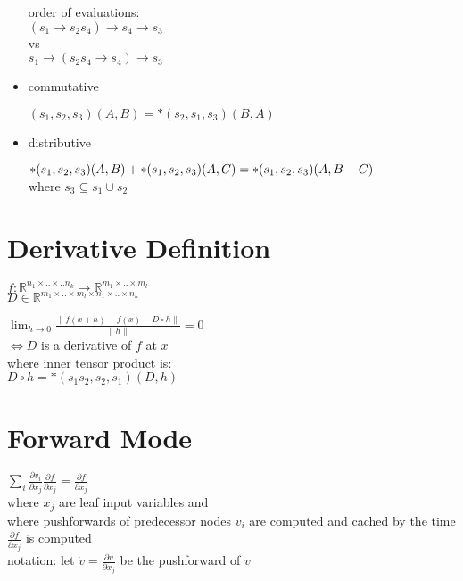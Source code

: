 \documentclass[8pt]{extarticle}
\newcommand{\R}{\mathbb{R}}
\begin{document}
\begin{multicols*}{2}
\begin{itemize}
    order of evaluations:\\
    $(s_1 \rightarrow s_2 s_4) \rightarrow s_4 \rightarrow s_3$\\
    vs\\
    $s_1 \rightarrow (s_2 s_4 \rightarrow s_4) \rightarrow s_3$
     
    \item commutative

      $(s_1,s_2,s_3)(A,B) = *(s_2,s_1,s_3)(B,A)$
    
    \item distributive

      $*(s_1,s_2,s_3)(A,B) + *(s_1,s_2,s_3)(A,C)\\= *(s_1,s_2,s_3)(A, B+C)$\\
      where $s_3 \subseteq s_1 \cup s_2$

  \end{itemize}

  \section{Derivative Definition}

  $f: \R^{n_1 \times .. \times .. n_k} \rightarrow \R^{m_1 \times .. \times m_l}$\\
  $D \in \R^{m_1 \times .. \times m_l \times n_1 \times .. \times n_k}$

  $\lim_{h \rightarrow 0} \frac{\| f(x+h) - f(x) - D \circ h\|}{\| h \|} = 0$\\
  $\iff D$ is a derivative of $f$ at $x$\\
  
  where inner tensor product is: \\
  $D \circ h = *(s_1 s_2, s_2, s_1)(D,h)$

  \vfill\null
  \columnbreak
    
  \section{Forward Mode}
  $\sum_{i} \frac{ \partial v_i}{\partial x_j} \frac{\partial f}{\partial x_j} = \frac{\partial f}{\partial x_j}$\\
  where $x_j$ are leaf input variables and\\
  where pushforwards of predecessor nodes $v_i$ are computed and cached by the time $\frac{\partial f}{\partial x_j}$ is computed\\
  
  notation: let $\dot{v} = \frac{\partial v}{\partial x_j}$ be the pushforward of $v$


\end{multicols*}
\end{document}
